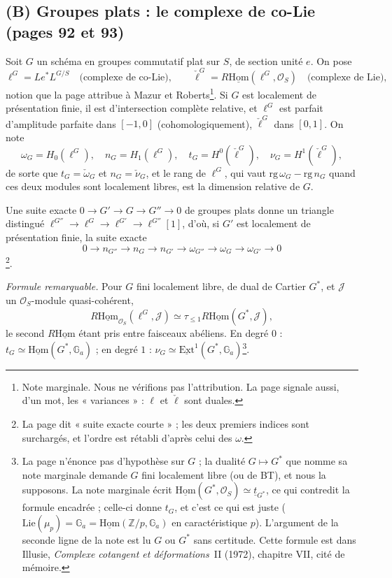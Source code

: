 \documentclass[11pt,a4paper]{article}
\begin{document}
\subsection*{(B) Groupes plats : le complexe de co-Lie (pages 92 et 93)}

Soit $G$ un schéma en groupes commutatif plat sur $S$, de section unité
$e$. On pose
\[
\ell^{G} = Le^{*} L^{G/S} \quad \text{(complexe de co-Lie)}, \qquad
\check{\ell}^{G} = R\underline{\mathrm{Hom}}(\ell^{G}, \mathcal{O}_S)
\quad \text{(complexe de Lie)},
\]
notion que la page attribue à Mazur et Roberts\footnote{Note marginale.
Nous ne vérifions pas l'attribution. La page signale aussi, d'un mot,
les « variances » : $\ell$ et $\check{\ell}$ sont duales.}. Si $G$ est
localement de présentation finie, il est d'intersection complète relative,
et $\ell^{G}$ est parfait d'amplitude parfaite dans $[-1, 0]$
(cohomologiquement), $\check{\ell}^{G}$ dans $[0, 1]$. On note
\[
\omega_G = H_0(\ell^{G}), \quad n_G = H_1(\ell^{G}), \quad
t_G = H^{0}(\check{\ell}^{G}), \quad \nu_G = H^{1}(\check{\ell}^{G}),
\]
de sorte que $t_G = \check{\omega}_G$ et $n_G = \check{\nu}_G$, et le rang
de $\ell^{G}$, qui vaut $\mathrm{rg}\,\omega_G - \mathrm{rg}\, n_G$ quand
ces deux modules sont localement libres, est la dimension relative de
$G$.

Une suite exacte $0 \to G' \to G \to G'' \to 0$ de groupes plats donne un
triangle distingué $\ell^{G''} \to \ell^{G} \to \ell^{G'} \to
\ell^{G''}[1]$, d'où, si $G'$ est localement de présentation finie, la
suite exacte
\[
0 \to n_{G''} \to n_G \to n_{G'} \to \omega_{G''} \to \omega_G \to
\omega_{G'} \to 0
\]
\footnote{La page dit « suite exacte courte » ; les deux premiers indices
sont surchargés, et l'ordre est rétabli d'après celui des $\omega$.}.

\emph{Formule remarquable.} Pour $G$ fini localement libre, de dual de
Cartier $G^{*}$, et $\mathcal{J}$ un $\mathcal{O}_S$-module
quasi-cohérent,
\[
R\underline{\mathrm{Hom}}_{\mathcal{O}_S}(\ell^{G}, \mathcal{J}) \simeq
\tau_{\leq 1} R\underline{\mathrm{Hom}}(G^{*}, \mathcal{J}),
\]
le second $R\underline{\mathrm{Hom}}$ étant pris entre faisceaux
abéliens. En degré $0$ : $t_G \simeq \underline{\mathrm{Hom}}(G^{*},
\mathbb{G}_a)$ ; en degré $1$ : $\nu_G \simeq
\underline{\mathrm{Ext}}^{1}(G^{*}, \mathbb{G}_a)$\footnote{La page
n'énonce pas d'hypothèse sur $G$ ; la dualité $G \mapsto G^{*}$ que nomme
sa note marginale demande $G$ fini localement libre (ou de BT), et nous la
supposons. La note marginale écrit $\underline{\mathrm{Hom}}(G^{*},
\mathcal{O}_S) \simeq \underline{t}_{G^{*}}$, ce qui contredit la formule
encadrée ; celle-ci donne $t_G$, et c'est ce qui est juste
($\mathrm{Lie}(\mu_p) = \mathbb{G}_a = \underline{\mathrm{Hom}}(\mathbb{Z}/p,
\mathbb{G}_a)$ en caractéristique $p$). L'argument de la seconde ligne de
la note est lu $G$ ou $G^{*}$ sans certitude. Cette formule est dans
Illusie, \emph{Complexe cotangent et déformations}~II (1972), chapitre
VII, cité de mémoire.}.
\end{document}
